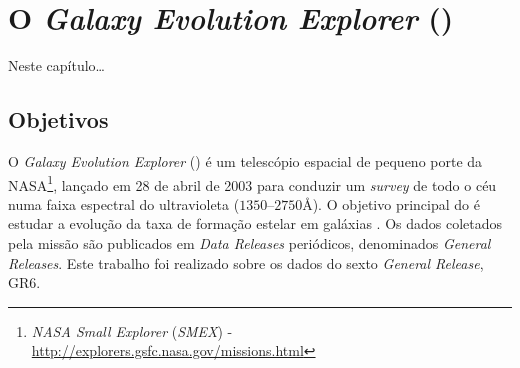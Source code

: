 


\chapter{O {\em Galaxy Evolution Explorer} (\galex)}
\label{sec:Galex}

Neste capítulo\ldots


\section{Objetivos}
\label{sec:Galex:Objetivos}

O {\em Galaxy Evolution Explorer} (\galex) é um telescópio espacial de pequeno
porte da NASA\footnote{{\em NASA Small Explorer} ({\em SMEX}) -
\url{http://explorers.gsfc.nasa.gov/missions.html}}, lançado em 28 de abril de
2003 para conduzir um {\em survey} de todo o céu numa faixa espectral do
ultravioleta ($1350$--$2750$\AA). O objetivo principal do \galex é estudar a
evolução da taxa de formação estelar em galáxias \citep{Martin2005}. Os dados
coletados pela missão são publicados em {\em Data Releases} periódicos,
denominados {\em General Releases}. Este trabalho foi realizado sobre os dados
do sexto {\em General Release}, GR6.

